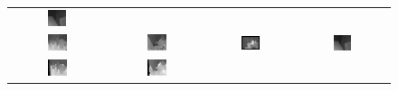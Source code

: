 \documentclass{ipol}
\begin{document}
\begin{figure}[h]
\begin{center}
\begin{tabular}{cccc}
\includegraphics[width=0.210\textwidth]{Images/theorical_results/venus.png}\\
\includegraphics[width=0.220\textwidth]{Images/true_disparity/cones.png} &
\includegraphics[width=0.220\textwidth]{Images/true_disparity/teddy.png} &
\includegraphics[width=0.245\textwidth]{Images/true_disparity/tsukuba.png} &
\includegraphics[width=0.210\textwidth]{Images/true_disparity/venus.png}\\
\includegraphics[width=0.220\textwidth]{Images/practical_results/cones.png} &
\includegraphics[width=0.220\textwidth]{Images/practical_results/teddy.png} &

\end{tabular}
\end{center}
\end{figure}
\end{document}
